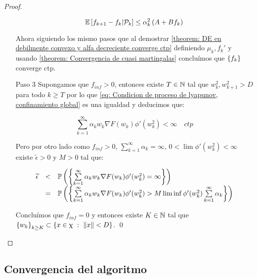 \begin{proof}
\begin{enumerate}
		\begin{equation}
		\mathbb{E} \left[{f_{k+1} - f_k} \vert \mathcal{P}_{k}\right] \leq \alpha_k^2\left(A + B f_k\right)
		\end{equation}	
		
		
		Ahora siguiendo los mismo pasos que al demostrar \ref{theorem: DE en debilmente convexo y alfa decreciente converge ctp} definiendo $\mu_k, f_k'$ y usando \ref{theorem: Convergencia de cuasi martingalas} conclu\'imos que $\left\lbrace f_k\right\rbrace$ converge ctp.
		
		\item[Paso 3] Supongamos que $f_{inf} >0$, entonces existe $T \in {\mathbb{N}}$  tal que $w_k^2, w_{k+1}^2 > D$ para todo $k \geq T$ por lo que \ref{eq: Condicion de proceso de lyapunov, confinamiento global} es una igualdad y deducimos que:
		
		\begin{equation}
			\sum\limits_{k=1}^{\infty} {\alpha_k w_k \nabla F(w_k) \phi'(w_k^2)} < \infty \quad ctp
		\end{equation}
		
		Pero por otro lado como $f_{inf} >0$, $\sum\limits_{k=1}^{\infty} {\alpha_k} = \infty$, $0 < \lim \phi'(w_k^2) < \infty$ existe $\widetilde{\epsilon} > 0$ y $M > 0$ tal que:
		
		\begin{equation*}
			\begin{array}{rcl}
			\widetilde{\epsilon} & < & \mathbb{P} \left(\left\lbrace\sum\limits_{k=1}^{\infty} {\alpha_k w_k \nabla F(w_k) \phi'(w_k^2)} = \infty \right\rbrace\right) \\
			& = & \mathbb{P} \left(\left\lbrace\sum\limits_{k=1}^{\infty} {\alpha_k w_k \nabla F(w_k) \phi'(w_k^2)} > M \liminf \phi'(w_k^2)\sum\limits_{k=1}^{\infty} {\alpha_k}\right\rbrace\right) 
			\end{array}
		\end{equation*}
		
		Conclu\'imos que $f_{inf} = 0$ y entonces existe $K \in {\mathbb{N}}$ tal que $\left\lbrace w_k\right\rbrace_{k \geq K} \subset \left\lbrace x \in \upchi ~:~ \left\lVert x\right\rVert < D \right\rbrace$. \qed
		
	\end{enumerate}
	
\end{proof}

\subsection{Convergencia del algoritmo}

